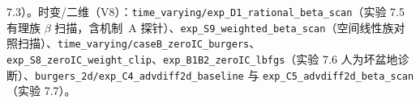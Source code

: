 \documentclass[fontset=windows,11pt]{ctexart}
\numberwithin{equation}{section}
\begin{document}
7.3）。时变/二维（V8）：\texttt{time\_\hspace{0pt}varying/\hspace{0pt}exp\_\hspace{0pt}D1\_\hspace{0pt}rational\_\hspace{0pt}beta\_\hspace{0pt}scan}（实验 7.5 有理族 $\beta$ 扫描，含机制~A 探针）、\texttt{exp\_\hspace{0pt}S9\_\hspace{0pt}weighted\_\hspace{0pt}beta\_\hspace{0pt}scan}（空间线性族对照扫描）、\texttt{time\_\hspace{0pt}varying/\hspace{0pt}caseB\_\hspace{0pt}zeroIC\_\hspace{0pt}burgers}、\texttt{exp\_\hspace{0pt}S8\_\hspace{0pt}zeroIC\_\hspace{0pt}weight\_\hspace{0pt}clip}、\texttt{exp\_\hspace{0pt}B1B2\_\hspace{0pt}zeroIC\_\hspace{0pt}lbfgs}（实验 7.6 人为坏盆地诊断）、\texttt{burgers\_\hspace{0pt}2d/\hspace{0pt}exp\_\hspace{0pt}C4\_\hspace{0pt}advdiff2d\_\hspace{0pt}baseline} 与 \texttt{exp\_\hspace{0pt}C5\_\hspace{0pt}advdiff2d\_\hspace{0pt}beta\_\hspace{0pt}scan}（实验 7.7）。
\end{document}
